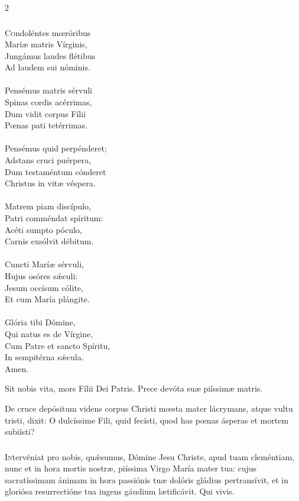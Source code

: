 \documentclass[9pt,twoside]{extarticle}
\begin{document}
\begin{multicols}{2}
\subsubsection*{\center {}}
\lettrine{C}ondoléntes mœróribus\\
Maríæ matris Vírginis,\\
Jungámus laudes flétibus\\
Ad laudem sui nóminis.\\
\\
Pensémus matris sérvuli\\
Spinas cordis acérrimas,\\
Dum vidit corpus Fílii\\
Pœnas pati tetérrimas.\\
\\
Pensémus quid perpénderet;\\
Adstans cruci puérpera,\\
Dum testaméntum cónderet\\
Christus in vitæ véspera.\\
\\
Matrem piam discípulo,\\
Patri comméndat spíritum:\\
Acéti sumpto póculo,\\
Carnis exsólvit débitum.\\
\\
Cuncti Maríæ sérvuli,\\
Hujus osóres sǽculi:\\
Jesum occísum cólite,\\
Et cum María plángite.\\
\\
Glória tibi Dómine,\\
Qui natus es de Vírgine,\\
Cum Patre et sancto Spíritu,\\
In sempitérna sǽcula.\\
Amen.

\begin{tightlist}{}
\item {} Sit nobis vita, mors Fílii Dei Patris.  Prece devóta suæ piíssimæ matris.
\item {} De cruce depósitum videns corpus Christi mœsta mater lácrymans, atque vultu tristi, dixit: O dulcíssime Fili, quid fecísti, quod has pœnas ásperas et mortem subiísti?
\end{tightlist}

\subsubsection*{\center {}}
\lettrine{I}ntervéniat pro nobis, quǽsumus, Dómine Jesu Christe, apud tuam cleméntiam, nunc et in hora mortis nostræ, piíssima Virgo María mater tua: cujus sacratíssimam ánimam in hora passiónis tuæ dolóris gládius pertransívit, et in gloriósa resurrectióne tua ingens gáudium lætificávit. Qui vivis.


\end{multicols}
\end{document}
